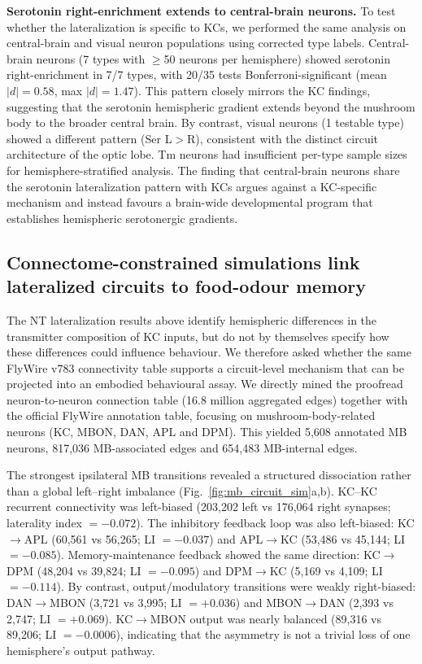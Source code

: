 \documentclass[10pt]{article}
\begin{document}
\textbf{Serotonin right-enrichment extends to central-brain neurons.} To test whether the lateralization is specific to KCs, we performed the same analysis on central-brain and visual neuron populations using corrected type labels. Central-brain neurons (7 types with $\geq$50 neurons per hemisphere) showed serotonin right-enrichment in 7/7 types, with 20/35 tests Bonferroni-significant (mean $|d| = 0.58$, max $|d| = 1.47$). This pattern closely mirrors the KC findings, suggesting that the serotonin hemispheric gradient extends beyond the mushroom body to the broader central brain. By contrast, visual neurons (1 testable type) showed a different pattern (Ser L$>$R), consistent with the distinct circuit architecture of the optic lobe. Tm neurons had insufficient per-type sample sizes for hemisphere-stratified analysis. The finding that central-brain neurons share the serotonin lateralization pattern with KCs argues against a KC-specific mechanism and instead favours a brain-wide developmental program that establishes hemispheric serotonergic gradients.

\subsection*{Connectome-constrained simulations link lateralized circuits to food-odour memory}

The NT lateralization results above identify hemispheric differences in the transmitter composition of KC inputs, but do not by themselves specify how these differences could influence behaviour. We therefore asked whether the same FlyWire v783 connectivity table supports a circuit-level mechanism that can be projected into an embodied behavioural assay. We directly mined the proofread neuron-to-neuron connection table (16.8 million aggregated edges) together with the official FlyWire annotation table, focusing on mushroom-body-related neurons (KC, MBON, DAN, APL and DPM). This yielded 5,608 annotated MB neurons, 817,036 MB-associated edges and 654,483 MB-internal edges.

The strongest ipsilateral MB transitions revealed a structured dissociation rather than a global left--right imbalance (Fig.~\ref{fig:mb_circuit_sim}a,b). KC--KC recurrent connectivity was left-biased (203,202 left vs 176,064 right synapses; laterality index $=-0.072$). The inhibitory feedback loop was also left-biased: KC$\rightarrow$APL (60,561 vs 56,265; LI $=-0.037$) and APL$\rightarrow$KC (53,486 vs 45,144; LI $=-0.085$). Memory-maintenance feedback showed the same direction: KC$\rightarrow$DPM (48,204 vs 39,824; LI $=-0.095$) and DPM$\rightarrow$KC (5,169 vs 4,109; LI $=-0.114$). By contrast, output/modulatory transitions were weakly right-biased: DAN$\rightarrow$MBON (3,721 vs 3,995; LI $=+0.036$) and MBON$\rightarrow$DAN (2,393 vs 2,747; LI $=+0.069$). KC$\rightarrow$MBON output was nearly balanced (89,316 vs 89,206; LI $=-0.0006$), indicating that the asymmetry is not a trivial loss of one hemisphere's output pathway.
\end{document}
